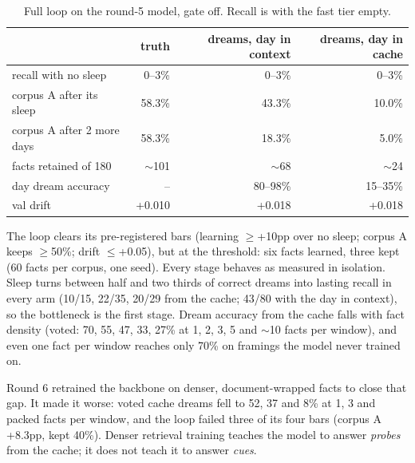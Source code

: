 \documentclass[11pt]{article}
\begin{document}
\begin{table}[t]\centering\small
\caption{Full loop on the round-5 model, gate off. Recall is with the fast tier
empty.}\label{tab:loop}
\begin{tabular}{lrrr}\toprule
& truth & dreams, day in context & dreams, day in cache\\\midrule
recall with no sleep & 0--3\% & 0--3\% & 0--3\%\\
corpus A after its sleep & 58.3\% & 43.3\% & 10.0\%\\
corpus A after 2 more days & 58.3\% & 18.3\% & 5.0\%\\
facts retained of 180 & $\sim$101 & $\sim$68 & $\sim$24\\
day dream accuracy & -- & 80--98\% & 15--35\%\\
val drift & +0.010 & +0.018 & +0.018\\\bottomrule
\end{tabular}\end{table}

The loop clears its pre-registered bars (learning $\geq$+10pp over no sleep;
corpus A keeps $\geq$50\%; drift $\leq$+0.05), but at the threshold: six facts
learned, three kept (60 facts per corpus, one seed). Every stage behaves as measured in isolation. Sleep turns
between half and two thirds of correct dreams into lasting recall in every
arm (10/15, 22/35, 20/29 from the cache; 43/80 with the day in context), so the bottleneck is the first
stage. Dream accuracy from the cache falls with fact density (voted: 70, 55,
47, 33, 27\% at 1, 2, 3, 5 and $\sim$10 facts per window), and even one fact per
window reaches only 70\% on framings the model never trained on.

Round 6 retrained the backbone on denser, document-wrapped facts to close that
gap. It made it worse: voted cache dreams fell to 52, 37 and 8\% at 1, 3 and
packed facts per window, and the loop failed three of its four bars (corpus A
+8.3pp, kept 40\%). Denser retrieval training teaches the model to answer
\emph{probes} from the cache; it does not teach it to answer \emph{cues}.
\end{document}
